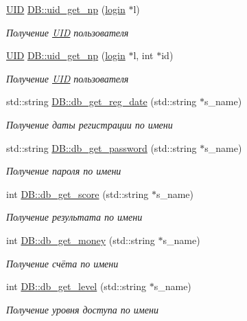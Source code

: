 \begin{DoxyCompactItemize}
\mbox{\hyperlink{struct_u_i_d}{U\+ID}} \mbox{\hyperlink{group__dbcpp_ga5acc70d365de65365c861533a2b755c3}{D\+B\+::uid\+\_\+get\+\_\+np}} (\mbox{\hyperlink{structlogin}{login}} $\ast$l)
\begin{DoxyCompactList}\small\item\em Получение \mbox{\hyperlink{struct_u_i_d}{U\+ID}} пользователя \end{DoxyCompactList}\item 
\mbox{\hyperlink{struct_u_i_d}{U\+ID}} \mbox{\hyperlink{group__dbcpp_ga9c55abcaab4db2b421bf72c968a818a4}{D\+B\+::uid\+\_\+get\+\_\+np}} (\mbox{\hyperlink{structlogin}{login}} $\ast$l, int $\ast$id)
\begin{DoxyCompactList}\small\item\em Получение \mbox{\hyperlink{struct_u_i_d}{U\+ID}} пользователя \end{DoxyCompactList}\item 
std\+::string \mbox{\hyperlink{group__dbcpp_gad7c6310d2669acd40978fd4662f90d53}{D\+B\+::db\+\_\+get\+\_\+reg\+\_\+date}} (std\+::string $\ast$s\+\_\+name)
\begin{DoxyCompactList}\small\item\em Получение даты регистрации по имени \end{DoxyCompactList}\item 
std\+::string \mbox{\hyperlink{group__dbcpp_ga35efc0a2ff41b4ef47c88c87f20feee4}{D\+B\+::db\+\_\+get\+\_\+password}} (std\+::string $\ast$s\+\_\+name)
\begin{DoxyCompactList}\small\item\em Получение пароля по имени \end{DoxyCompactList}\item 
int \mbox{\hyperlink{group__dbcpp_ga990cefb97ea7222649511f37334a8601}{D\+B\+::db\+\_\+get\+\_\+score}} (std\+::string $\ast$s\+\_\+name)
\begin{DoxyCompactList}\small\item\em Получение результата по имени \end{DoxyCompactList}\item 
int \mbox{\hyperlink{group__dbcpp_ga004b212ee48936251ff24b9f70d67dd0}{D\+B\+::db\+\_\+get\+\_\+money}} (std\+::string $\ast$s\+\_\+name)
\begin{DoxyCompactList}\small\item\em Получение счёта по имени \end{DoxyCompactList}\item 
int \mbox{\hyperlink{group__dbcpp_ga7792fdc9d2dc66bfa5ba84aa9db1ee8b}{D\+B\+::db\+\_\+get\+\_\+level}} (std\+::string $\ast$s\+\_\+name)
\begin{DoxyCompactList}\small\item\em Получение уровня доступа по имени \end{DoxyCompactList}\end{DoxyCompactItemize}


